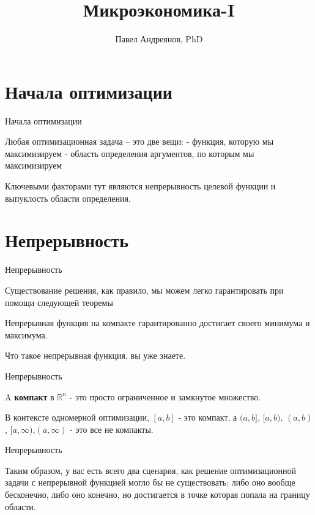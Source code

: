 \documentclass{beamer}
\title{
Микроэкономика-I
}
\author{
Павел Андреянов, PhD
}
\begin{document}
\maketitle

\section{Начала оптимизации}

\begin{frame}{Начала оптимизации}

Любая оптимизационная задача – это две вещи:
- функция, которую мы максимизируем
- область определения аргументов, по которым мы максимизируем

Ключевыми факторами тут являются непрерывность целевой функции и выпуклость области определения.

\end{frame}

\section{Непрерывность}

\begin{frame}{Непрерывность}

Существование решения, как правило, мы можем легко гарантировать при помощи следующей теоремы

\begin{theorem}[Вейерштрасса]

Непрерывная функция на компакте гарантированно достигает своего минимума и максимума.
\end{theorem}

Что такое непрерывная функция, вы уже знаете.

\end{frame}

\begin{frame}{Непрерывность}

A \textbf{компакт} в $\mathbb{R}^n$ - это просто ограниченное и замкнутое множество. 

В контексте одномерной оптимизации, $[a,b]$ - это компакт, а $(a,b]$, $[a,b)$, $(a,b)$, $[a,\infty)$,$(a,\infty)$ - это все не компакты. 

\end{frame}

\begin{frame}{Непрерывность}

Таким образом, у вас есть всего два сценария, как решение оптимизационной задачи с непрерывной функцией могло бы не существовать: либо оно вообще бесконечно, либо оно конечно, но достигается в точке которая попала на границу области.

\end{frame}
\end{document}
